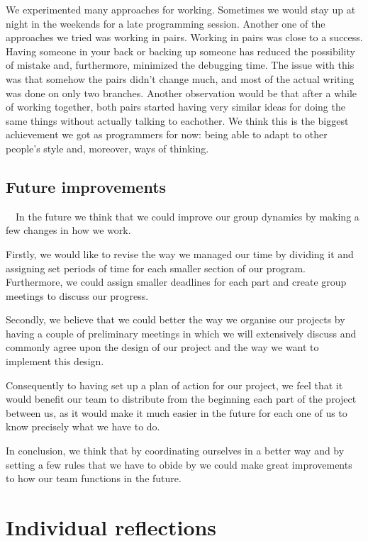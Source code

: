 \documentclass{article}
\begin{document}
We experimented many approaches for working. Sometimes we would stay up at
night in the weekends for a late programming session. Another one of the
approaches we tried was working in pairs. Working in pairs was close to a
success. Having someone in your back or backing up someone has reduced the
possibility of mistake and, furthermore, minimized the debugging time. The
issue with this was that somehow the pairs didn't change much, and most of the
actual writing was done on only two branches. Another observation would be
that after a while of working together, both pairs started having very similar
ideas for doing the same things without actually talking to eachother. We
think this is the biggest achievement we got as programmers for now: being able
to adapt to other people's style and, moreover, ways of thinking.

\subsection{Future improvements}

\ \ In the future we think that we could improve our group dynamics by making
a few changes in how we work.

Firstly, we would like to revise the way we managed our time by dividing it
and assigning set periods of time for each smaller section of our program.
Furthermore, we could assign smaller deadlines for each part and create group
meetings to discuss our progress.

Secondly, we believe that we could better the way we organise our projects by
having a couple of preliminary meetings in which we will extensively discuss
and commonly agree upon the design of our project and the way we want to
implement this design.

Consequently to having set up a plan of action for our project, we feel that
it would benefit our team to distribute from the beginning each part of the
project between us, as it would make it much easier in the future for each one
of us to know precisely what we have to do.

In conclusion, we think that by coordinating ourselves in a better way and by
setting a few rules that we have to obide by we could make great improvements
to how our team functions in the future.

\section{Individual reflections}
\end{document}
